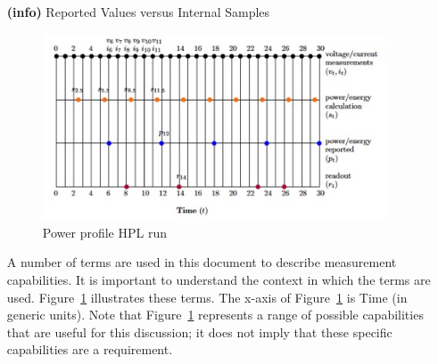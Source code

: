\begin{itemize}
\item[{\textbf{(info)}}]
Reported Values versus Internal Samples

\begin{figure}[htbp]
\centering
\includegraphics[width=4in]{fig1}
\caption{Power profile HPL run}
\label{fig:powprof}
\end{figure}

A number of terms are used in this document to describe measurement capabilities. 
It is important to understand the context in which the terms are used. 
Figure~\ref{fig:powprof} illustrates these terms. The x-axis of Figure~\ref{fig:powprof} 
is Time (in generic units). Note that Figure~\ref{fig:powprof} represents a range of 
possible capabilities that are useful for this discussion; it does not imply that 
these specific capabilities are a requirement.


\end{itemize}
